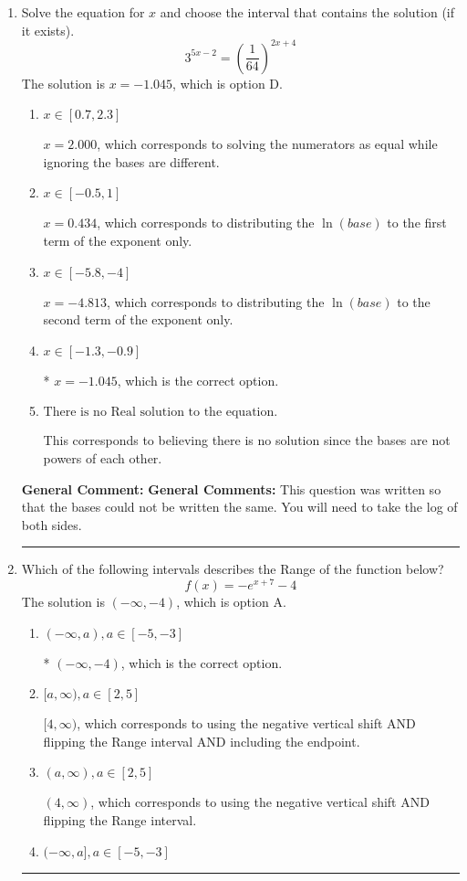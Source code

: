 \documentclass{extbook}[14pt]
\newcommand{\litem}[1]{\item #1

\rule{\textwidth}{0.4pt}}
\begin{document}
\begin{enumerate}\litem{
Solve the equation for $x$ and choose the interval that contains the solution (if it exists).
\[ 3^{5x-2} = \left(\frac{1}{64}\right)^{2x+4} \]The solution is \( x = -1.045 \), which is option D.\begin{enumerate}[label=\Alph*.]
\item \( x \in [0.7, 2.3] \)

$x = 2.000$, which corresponds to solving the numerators as equal while ignoring the bases are different.
\item \( x \in [-0.5, 1] \)

$x = 0.434$, which corresponds to distributing the $\ln(base)$ to the first term of the exponent only.
\item \( x \in [-5.8, -4] \)

$x = -4.813$, which corresponds to distributing the $\ln(base)$ to the second term of the exponent only.
\item \( x \in [-1.3, -0.9] \)

* $x = -1.045$, which is the correct option.
\item \( \text{There is no Real solution to the equation.} \)

This corresponds to believing there is no solution since the bases are not powers of each other.
\end{enumerate}

\textbf{General Comment:} \textbf{General Comments:} This question was written so that the bases could not be written the same. You will need to take the log of both sides.
}
\litem{
Which of the following intervals describes the Range of the function below?
\[ f(x) = -e^{x+7}-4 \]The solution is \( (-\infty, -4) \), which is option A.\begin{enumerate}[label=\Alph*.]
\item \( (-\infty, a), a \in [-5, -3] \)

* $(-\infty, -4)$, which is the correct option.
\item \( [a, \infty), a \in [2, 5] \)

$[4, \infty)$, which corresponds to using the negative vertical shift AND flipping the Range interval AND including the endpoint.
\item \( (a, \infty), a \in [2, 5] \)

$(4, \infty)$, which corresponds to using the negative vertical shift AND flipping the Range interval.
\item \( (-\infty, a], a \in [-5, -3] \)


\end{enumerate}}
\end{enumerate}
\end{document}
